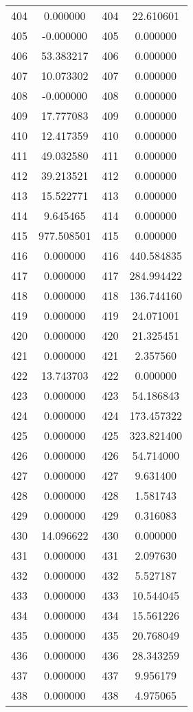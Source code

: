 \documentclass[12pt]{article}
\begin{document}
\begin{longtable}{@{}cccc@{}}
404 & 0.000000 & 404 & 22.610601 \\
405 & -0.000000 & 405 & 0.000000 \\
406 & 53.383217 & 406 & 0.000000 \\
407 & 10.073302 & 407 & 0.000000 \\
408 & -0.000000 & 408 & 0.000000 \\
409 & 17.777083 & 409 & 0.000000 \\
410 & 12.417359 & 410 & 0.000000 \\
411 & 49.032580 & 411 & 0.000000 \\
412 & 39.213521 & 412 & 0.000000 \\
413 & 15.522771 & 413 & 0.000000 \\
414 & 9.645465 & 414 & 0.000000 \\
415 & 977.508501 & 415 & 0.000000 \\
416 & 0.000000 & 416 & 440.584835 \\
417 & 0.000000 & 417 & 284.994422 \\
418 & 0.000000 & 418 & 136.744160 \\
419 & 0.000000 & 419 & 24.071001 \\
420 & 0.000000 & 420 & 21.325451 \\
421 & 0.000000 & 421 & 2.357560 \\
422 & 13.743703 & 422 & 0.000000 \\
423 & 0.000000 & 423 & 54.186843 \\
424 & 0.000000 & 424 & 173.457322 \\
425 & 0.000000 & 425 & 323.821400 \\
426 & 0.000000 & 426 & 54.714000 \\
427 & 0.000000 & 427 & 9.631400 \\
428 & 0.000000 & 428 & 1.581743 \\
429 & 0.000000 & 429 & 0.316083 \\
430 & 14.096622 & 430 & 0.000000 \\
431 & 0.000000 & 431 & 2.097630 \\
432 & 0.000000 & 432 & 5.527187 \\
433 & 0.000000 & 433 & 10.544045 \\
434 & 0.000000 & 434 & 15.561226 \\
435 & 0.000000 & 435 & 20.768049 \\
436 & 0.000000 & 436 & 28.343259 \\
437 & 0.000000 & 437 & 9.956179 \\
438 & 0.000000 & 438 & 4.975065 \\

\end{longtable}
\end{document}
